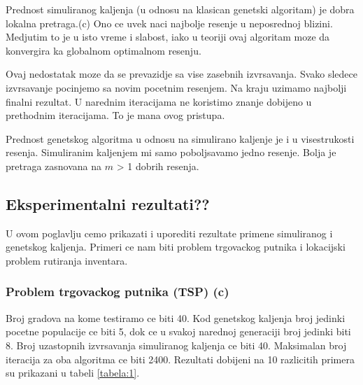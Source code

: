 \documentclass[a4paper]{article}
\begin{document}
Prednost simuliranog kaljenja (u odnosu na klasican genetski algoritam) je dobra lokalna pretraga.(c) Ono ce uvek naci najbolje resenje u neposrednoj blizini. Medjutim to je u isto vreme i slabost, iako u teoriji ovaj algoritam moze da konvergira ka globalnom optimalnom resenju. \par
Ovaj nedostatak moze da se prevazidje sa vise zasebnih izvrsavanja. Svako sledece izvrsavanje pocinjemo sa novim pocetnim resenjem. Na kraju uzimamo najbolji finalni rezultat. U narednim iteracijama ne koristimo znanje dobijeno u prethodnim iteracijama. To je mana ovog pristupa. \par
Prednost genetskog algoritma u odnosu na simulirano kaljenje je i u visestrukosti resenja. Simuliranim kaljenjem mi samo poboljsavamo jedno resenje. Bolja je pretraga zasnovana na $m$ > 1 dobrih resenja.


\subsection{Eksperimentalni rezultati??}

U ovom poglavlju cemo prikazati i uporediti rezultate primene simuliranog i genetskog kaljenja. Primeri ce nam biti problem trgovackog putnika i lokacijski problem rutiranja inventara.  

\subsubsection{Problem trgovackog putnika (TSP) (c)}

Broj gradova na kome testiramo ce biti 40. Kod genetskog kaljenja broj jedinki pocetne populacije ce biti 5, dok ce u svakoj narednoj generaciji broj jedinki biti 8. Broj uzastopnih izvrsavanja simuliranog kaljenja ce biti 40. Maksimalan broj iteracija za oba algoritma ce biti 2400. Rezultati dobijeni na 10 razlicitih primera su prikazani u tabeli \ref{tabela:1}. \\ 
\end{document}
